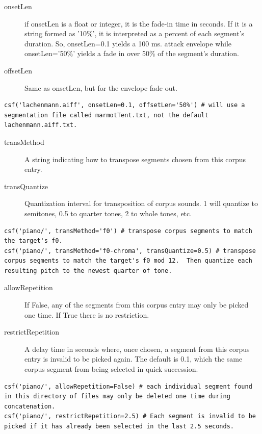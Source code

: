 \documentclass{article}
\begin{document}
\begin{spacing}{1.2}
\begin{description}
\item[onsetLen] if onsetLen is a float or integer, it is the fade-in time in seconds.  If it is a string formed as '10\%', it is interpreted as a percent of each segment's duration.  So, onsetLen=0.1 yields a 100 ms. attack envelope while onsetLen='50\%' yields a fade in over 50\% of the segment's duration.

\item[offsetLen] Same as onsetLen, but for the envelope fade out.

\end{description}
\begin{lstlisting}
csf('lachenmann.aiff', onsetLen=0.1, offsetLen='50%') # will use a segmentation file called marmotTent.txt, not the default lachenmann.aiff.txt.
\end{lstlisting}
\begin{description}

\item[transMethod] A string indicating how to transpose segments chosen from this corpus entry.

\item[transQuantize] Quantization interval for transposition of corpus sounds.  1 will quantize to semitones, 0.5 to quarter tones, 2 to whole tones, etc.

\end{description}
\begin{lstlisting}
csf('piano/', transMethod='f0') # transpose corpus segments to match the target's f0.
csf('piano/', transMethod='f0-chroma', transQuantize=0.5) # transpose corpus segments to match the target's f0 mod 12.  Then quantize each resulting pitch to the newest quarter of tone.
\end{lstlisting}
\begin{description}

\item[allowRepetition] If False, any of the segments from this corpus entry may only be picked one time.  If True there is no restriction.

\item[restrictRepetition] A delay time in seconds where, once chosen, a segment from this corpus entry is invalid to be picked again.  The default is 0.1, which the same corpus segment from being selected in quick succession.

\end{description}
\begin{lstlisting}
csf('piano/', allowRepetition=False) # each individual segment found in this directory of files may only be deleted one time during concatenation.
csf('piano/', restrictRepetition=2.5) # Each segment is invalid to be picked if it has already been selected in the last 2.5 seconds.
\end{lstlisting}
\begin{description}



\end{description}
\end{spacing}
\end{document}
